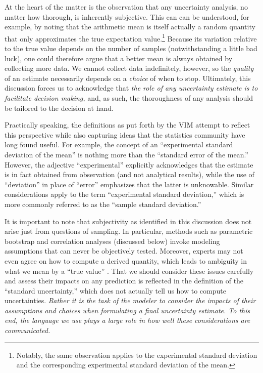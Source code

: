 At the heart of the matter is the observation that any uncertainty analysis, no matter how thorough, is inherently subjective.  This can can be understood, for example, by noting that the arithmetic mean is itself actually a random quantity that only approximates the true expectation value.\footnote{Notably, the same observation applies to the experimental standard deviation and the corresponding experimental standard deviation of the mean.}  Because its variation relative to the true value depends on the number of samples (notwithstanding a little bad luck), one could therefore argue that a better mean is always obtained by collecting more data.   We cannot collect data indefinitely, however, so the {\it quality} of an estimate necessarily depends on a {\it choice} of when to stop.  Ultimately, this discussion forces us to acknowledge that {\it the role of any uncertainty estimate is to facilitate decision making,} and, as such, the thoroughness of any analysis should be tailored to the decision at hand.

Practically speaking, the definitions as put forth by the VIM attempt to reflect this perspective while also capturing ideas that the statistics community have long found useful.  For example, the concept of an ``experimental standard deviation of the mean'' is nothing more than the ``standard error of the mean.''  However, the adjective ``experimental'' explicitly acknowledges that the estimate is in fact obtained from observation (and not analytical results), while the use of ``deviation'' in place of ``error'' emphasizes that the latter is unknowable.  Similar considerations apply to the term ``experimental standard deviation,'' which is more commonly referred to as the ``sample standard deviation.''

It is important to note that subjectivity as identified in this discussion does not arise just from questions of sampling. In particular, methods such as parametric bootstrap and correlation analyses (discussed below) invoke modeling assumptions that can never be objectively tested.  Moreover, experts may not even agree on how to compute a derived quantity, which leads to ambiguity in what we mean by a ``true value'' \cite{patrone1}.  That we should consider these issues carefully and assess their impacts on any prediction is reflected in the definition of the ``standard uncertainty,'' which does not actually tell us how to compute uncertainties.  {\it Rather it is the task of the modeler to consider the impacts of their assumptions and choices when formulating a final uncertainty estimate.  To this end, the language we use plays a large role in how well these considerations are communicated.}

